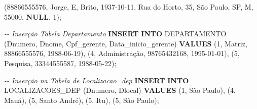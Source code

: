 \documentclass[
]{article}
\newenvironment{Shaded}{\begin{snugshade}}{\end{snugshade}}
\newcommand{\CommentTok}[1]{\textcolor[rgb]{0.56,0.35,0.01}{\textit{#1}}}
\newcommand{\DecValTok}[1]{\textcolor[rgb]{0.00,0.00,0.81}{#1}}
\newcommand{\KeywordTok}[1]{\textcolor[rgb]{0.13,0.29,0.53}{\textbf{#1}}}
\newcommand{\NormalTok}[1]{#1}
\newcommand{\StringTok}[1]{\textcolor[rgb]{0.31,0.60,0.02}{#1}}
\begin{document}
\begin{Shaded}
\begin{Highlighting}[]
\NormalTok{(}\StringTok{\textquotesingle{}88866555576\textquotesingle{}}\NormalTok{, }\StringTok{\textquotesingle{}Jorge\textquotesingle{}}\NormalTok{, }\StringTok{\textquotesingle{}E\textquotesingle{}}\NormalTok{, }\StringTok{\textquotesingle{}Brito\textquotesingle{}}\NormalTok{, }\StringTok{\textquotesingle{}1937{-}10{-}11\textquotesingle{}}\NormalTok{, }\StringTok{\textquotesingle{}Rua do Horto, 35, São Paulo, SP\textquotesingle{}}\NormalTok{, }
\StringTok{\textquotesingle{}M\textquotesingle{}}\NormalTok{, }\DecValTok{55000}\NormalTok{, }\KeywordTok{NULL}\NormalTok{, }\DecValTok{1}\NormalTok{);}
\end{Highlighting}
\end{Shaded}

\begin{Shaded}
\begin{Highlighting}[]
\CommentTok{{-}{-} Inserção Tabela Departamento}
\KeywordTok{INSERT} \KeywordTok{INTO}\NormalTok{ DEPARTAMENTO (Dnumero, Dnome, Cpf\_gerente, Data\_inicio\_gerente) }\KeywordTok{VALUES}
\NormalTok{(}\DecValTok{1}\NormalTok{, }\StringTok{\textquotesingle{}Matriz\textquotesingle{}}\NormalTok{, }\StringTok{\textquotesingle{}88866555576\textquotesingle{}}\NormalTok{, }\StringTok{\textquotesingle{}1988{-}06{-}19\textquotesingle{}}\NormalTok{),}
\NormalTok{(}\DecValTok{4}\NormalTok{, }\StringTok{\textquotesingle{}Administração\textquotesingle{}}\NormalTok{, }\StringTok{\textquotesingle{}98765432168\textquotesingle{}}\NormalTok{, }\StringTok{\textquotesingle{}1995{-}01{-}01\textquotesingle{}}\NormalTok{),}
\NormalTok{(}\DecValTok{5}\NormalTok{, }\StringTok{\textquotesingle{}Pesquisa\textquotesingle{}}\NormalTok{, }\StringTok{\textquotesingle{}33344555587\textquotesingle{}}\NormalTok{, }\StringTok{\textquotesingle{}1988{-}05{-}22\textquotesingle{}}\NormalTok{);}
\end{Highlighting}
\end{Shaded}

\begin{Shaded}
\begin{Highlighting}[]
\CommentTok{{-}{-} Inserção na Tabela de Localizacao\_dep}
\KeywordTok{INSERT} \KeywordTok{INTO}\NormalTok{ LOCALIZACOES\_DEP (Dnumero, Dlocal) }\KeywordTok{VALUES}
\NormalTok{(}\DecValTok{1}\NormalTok{, }\StringTok{\textquotesingle{}São Paulo\textquotesingle{}}\NormalTok{),}
\NormalTok{(}\DecValTok{4}\NormalTok{, }\StringTok{\textquotesingle{}Mauá\textquotesingle{}}\NormalTok{),}
\NormalTok{(}\DecValTok{5}\NormalTok{, }\StringTok{\textquotesingle{}Santo André\textquotesingle{}}\NormalTok{),}
\NormalTok{(}\DecValTok{5}\NormalTok{, }\StringTok{\textquotesingle{}Itu\textquotesingle{}}\NormalTok{),}
\NormalTok{(}\DecValTok{5}\NormalTok{, }\StringTok{\textquotesingle{}São Paulo\textquotesingle{}}\NormalTok{);}
\end{Highlighting}
\end{Shaded}
\end{document}
